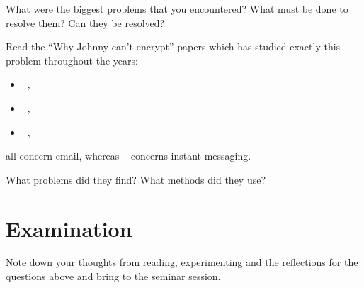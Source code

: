 What were the biggest problems that you encountered?
What must be done to resolve them?
Can they be resolved?

Read the \enquote{Why Johnny can't encrypt} papers which has studied exactly 
this problem throughout the years:
\begin{itemize}
  \item {}~\cite{WhyJohnnyCantEncrypt},
  \item {}~\cite{WhyJohnnyStillCantEncrypt},
  \item {}~\cite{WhyJohnnyStillStillCantEncrypt},
\end{itemize}
all concern email, whereas 
~\cite{CanJohnnyFinallyEncrypt} concerns 
instant messaging.

What problems did they find?
What methods did they use?


\section{Examination}

Note down your thoughts from reading, experimenting and the reflections for the 
questions above and bring to the seminar session.


\printbibliography
